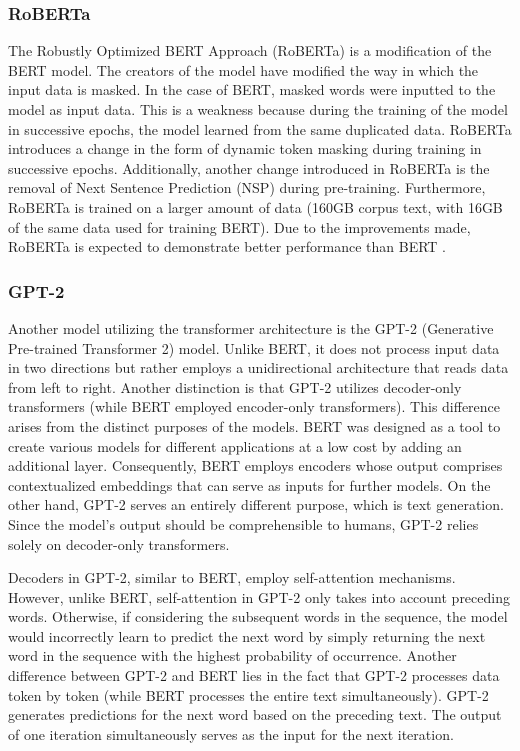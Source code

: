 \subsubsection{RoBERTa}
The Robustly Optimized BERT Approach (RoBERTa) is a modification of the BERT model. The creators of the model have modified the way in which the input data is masked. In the case of BERT, masked words were inputted to the model as input data. This is a weakness because during the training of the model in successive epochs, the model learned from the same duplicated data. RoBERTa introduces a change in the form of dynamic token masking during training in successive epochs. Additionally, another change introduced in RoBERTa is the removal of Next Sentence Prediction (NSP) during pre-training.
Furthermore, RoBERTa is trained on a larger amount of data (160GB corpus text, with 16GB of the same data used for training BERT).
Due to the improvements made, RoBERTa is expected to demonstrate better performance than BERT \autocite{Liu2019}.

\subsubsection{GPT-2}
Another model utilizing the transformer architecture is the GPT-2 (Generative Pre-trained Transformer 2) model. Unlike BERT, it does not process input data in two directions but rather employs a unidirectional architecture that reads data from left to right. Another distinction is that GPT-2 utilizes decoder-only transformers (while BERT employed encoder-only transformers). This difference arises from the distinct purposes of the models. BERT was designed as a tool to create various models for different applications at a low cost by adding an additional layer. Consequently, BERT employs encoders whose output comprises contextualized embeddings that can serve as inputs for further models. On the other hand, GPT-2 serves an entirely different purpose, which is text generation. Since the model's output should be comprehensible to humans, GPT-2 relies solely on decoder-only transformers.

Decoders in GPT-2, similar to BERT, employ self-attention mechanisms. However, unlike BERT, self-attention in GPT-2 only takes into account preceding words. Otherwise, if considering the subsequent words in the sequence, the model would incorrectly learn to predict the next word by simply returning the next word in the sequence with the highest probability of occurrence. Another difference between GPT-2 and BERT lies in the fact that GPT-2 processes data token by token (while BERT processes the entire text simultaneously). GPT-2 generates predictions for the next word based on the preceding text. The output of one iteration simultaneously serves as the input for the next iteration.


